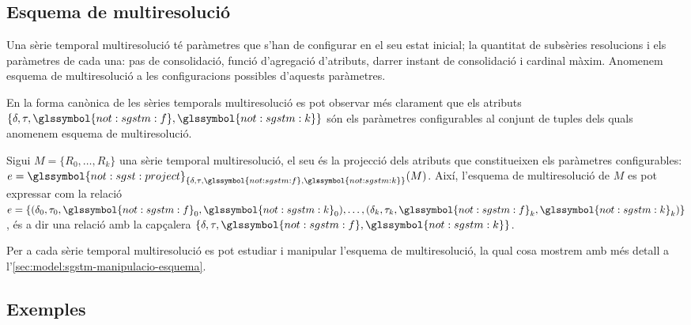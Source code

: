 \subsection{Esquema de multiresolució}

Una sèrie temporal multiresolució té paràmetres que
s'han de configurar en el seu estat inicial; la quantitat de subsèries
resolucions i els paràmetres de cada una: pas de consolidació, funció
d'agregació d'atributs, darrer instant de consolidació i cardinal
màxim. Anomenem esquema de multiresolució a les configuracions
possibles d'aquests paràmetres.


En la forma canònica de les sèries temporals multiresolució es pot
observar més clarament que els atributs
$\{\delta,\tau,\glssymbol{not:sgstm:f},\glssymbol{not:sgstm:k}\}$ són
els paràmetres configurables al conjunt de tuples dels quals anomenem
esquema de multiresolució.
\begin{definition}
  \label{def:sgstm:esquema}
  Sigui $M=\{R_0,\dotsc,R_k\}$ una sèrie temporal multiresolució, el
  seu  és la
  projecció dels atributs que constitueixen els paràmetres
  configurables:
  $e=\glssymbol{not:sgst:project}_{\{\delta,\tau,\glssymbol{not:sgstm:f},\glssymbol{not:sgstm:k}\}}(M)$. Així,
  l'esquema de multiresolució de $M$ es pot expressar com la relació
  $e = \{
  (\delta_0,\tau_0,\glssymbol{not:sgstm:f}_0,\glssymbol{not:sgstm:k}_0),
  \dotsc,
  (\delta_k,\tau_k,\glssymbol{not:sgstm:f}_k,\glssymbol{not:sgstm:k}_k)\}$,
  és a dir una relació amb la capçalera
  $\{\delta,\tau,\glssymbol{not:sgstm:f},\glssymbol{not:sgstm:k}\}$.
\end{definition}


Per a cada sèrie temporal multiresolució es pot estudiar i manipular
l'esquema de multiresolució, la qual cosa mostrem amb més detall a
l'\autoref{sec:model:sgstm-manipulacio-esquema}.





\subsection{Exemples}


